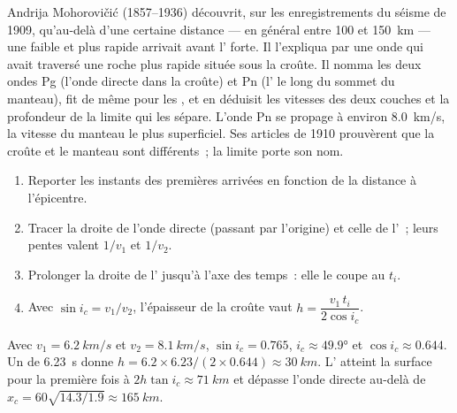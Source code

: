 \begin{history}
Andrija Mohorovičić (1857--1936) découvrit, sur les enregistrements du
séisme de 1909, qu'au-delà d'une certaine distance --- en général entre 100
et \qty{150}{km} --- une  faible et plus rapide arrivait avant l' forte. Il l'expliqua par une onde qui avait traversé une roche plus
rapide située sous la croûte. Il nomma les deux ondes Pg (l'onde directe
dans la croûte) et Pn (l' le long du sommet du manteau), fit de
même pour les , et en déduisit les vitesses des deux couches et la
profondeur de la limite qui les sépare. L'onde Pn se propage à environ
\qty{8.0}{km/s}, la vitesse du manteau le plus superficiel. Ses articles de
1910 prouvèrent que la croûte et le manteau sont différents~; la limite
porte son nom.
\end{history}

\begin{method}\label{met:g11:seismic-structure:moho}
\begin{enumerate}
  \item Reporter les instants des premières arrivées en fonction de la
        distance à l'épicentre.
  \item Tracer la droite de l'onde directe (passant par l'origine) et celle
        de l'~; leurs pentes valent $1/v_1$ et $1/v_2$.
  \item Prolonger la droite de l' jusqu'à l'axe des temps~: elle
        le coupe au  $t_i$.
  \item Avec $\sin i_c = v_1/v_2$, l'épaisseur de la croûte vaut
        $h = \dfrac{v_1\,t_i}{2\cos i_c}$.
\end{enumerate}
\end{method}

\begin{example}\label{ex:g11:seismic-structure:moho}
Avec $v_1 = \qty{6.2}{km/s}$ et $v_2 = \qty{8.1}{km/s}$, $\sin i_c = 0.765$,
$i_c \approx \ang{49.9}$ et $\cos i_c \approx 0.644$. Un  de
\qty{6.23}{s} donne $h = 6.2 \times 6.23/(2 \times 0.644) \approx
\qty{30}{km}$. L' atteint la surface pour la première fois à
$2h\tan i_c \approx \qty{71}{km}$ et dépasse l'onde directe au-delà de
$x_c = 60\sqrt{14.3/1.9} \approx \qty{165}{km}$.
\end{example}

